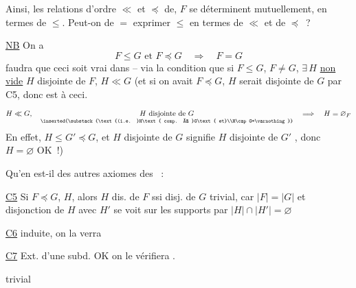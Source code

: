 
Ainsi, les relations d'ordre $\ll$ et $\preceq$ de, $F$ se déterminent mutuellement, en termes de $\leq$. Peut-on de $=$ exprimer $\leq$ en termes de $\ll$ et de $\preceq$~?

\uline{NB} On a
\[
 F\leq G\text{ et }F\preceq G\quad\Longrightarrow\quad F=G
\]
 faudra que ceci soit vrai dans   -- via la condition que si $F\leq G$, $F\ne G$, $\exists\,H$  \uline{non vide} $H$ disjointe de $F$, $H\ll G$ (et si on avait $F\preceq G$, $H$ serait disjointe de $G$ par C5, donc  est  à ceci. 
\[
 H\ll G,\quad
 \underset{\inserted{\substack{\text{(i.e. }H\text{ comp. à }G\text{ et}\\H\cap G=\varnothing}}}{H\text{ disjointe de }G}
 \quad\Longrightarrow\quad H=\varnothing_{F}
\]
En effet, $H\leq G'\preceq G$,  et $H$ disjointe de $G$ signifie $H$ disjointe de $G'$ , donc $H=\varnothing$ OK~!)


Qu'en est-il des autres axiomes des ~:

\uline{C5} Si $F\preceq G$, $H$, alors $H$ dis. de $F$ ssi disj. de $G$ trivial, car $|F|=|G|$ et disjonction de $H$ avec $H'$ se voit sur les supports par $|H|\cap|H'|=\varnothing$

\uline{C6}  induite, on la verra 

\uline{C7} Ext. d'une subd. OK on le vérifiera .

\uline{} trivial
